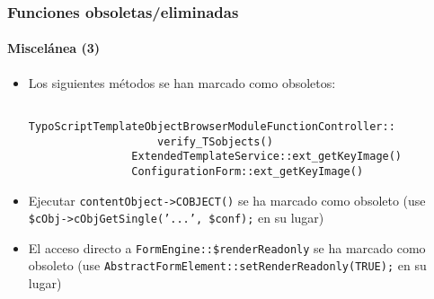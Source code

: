 \begin{frame}[fragile]
	\frametitle{Funciones obsoletas/eliminadas}
	\framesubtitle{Miscelánea (3)}

	\begin{itemize}
		\item Los siguientes métodos se han marcado como obsoletos:

			\begin{lstlisting}
				TypoScriptTemplateObjectBrowserModuleFunctionController::
				    verify_TSobjects()
				ExtendedTemplateService::ext_getKeyImage()
				ConfigurationForm::ext_getKeyImage()
			\end{lstlisting}

 		\item Ejecutar \texttt{contentObject->COBJECT()} se ha marcado como obsoleto\newline
 			\small(use \texttt{\$cObj->cObjGetSingle('...', \$conf);} en su lugar)\normalsize
 
		\item El acceso directo a \texttt{FormEngine::\$renderReadonly} se ha marcado como obsoleto\newline
			\small(use \texttt{AbstractFormElement::setRenderReadonly(TRUE);} en su lugar)\normalsize
 
	\end{itemize}

\end{frame}


